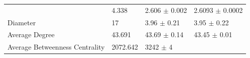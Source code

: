 \documentclass[12pt,twoside]{amherstthesis}
\begin{document}
\begin{longtable}[]{@{}llll@{}}
\begin{minipage}[t]{0.29\columnwidth}
  \end{minipage} & \begin{minipage}[t]{0.11\columnwidth}\raggedright\strut
  4.338\strut
  \end{minipage} & \begin{minipage}[t]{0.25\columnwidth}\raggedright\strut
  2.606 \(\pm\) 0.002\strut
  \end{minipage} & \begin{minipage}[t]{0.25\columnwidth}\raggedright\strut
  2.6093 \(\pm\) 0.0002\strut
  \end{minipage}\tabularnewline
  \begin{minipage}[t]{0.29\columnwidth}\raggedright\strut
  Diameter\strut
  \end{minipage} & \begin{minipage}[t]{0.11\columnwidth}\raggedright\strut
  17\strut
  \end{minipage} & \begin{minipage}[t]{0.25\columnwidth}\raggedright\strut
  3.96 \(\pm\) 0.21\strut
  \end{minipage} & \begin{minipage}[t]{0.25\columnwidth}\raggedright\strut
  3.95 \(\pm\) 0.22\strut
  \end{minipage}\tabularnewline
  \begin{minipage}[t]{0.29\columnwidth}\raggedright\strut
  Average Degree\strut
  \end{minipage} & \begin{minipage}[t]{0.11\columnwidth}\raggedright\strut
  43.691\strut
  \end{minipage} & \begin{minipage}[t]{0.25\columnwidth}\raggedright\strut
  43.69 \(\pm\) 0.14\strut
  \end{minipage} & \begin{minipage}[t]{0.25\columnwidth}\raggedright\strut
  43.45 \(\pm\) 0.01\strut
  \end{minipage}\tabularnewline
  \begin{minipage}[t]{0.29\columnwidth}\raggedright\strut
  Average Betweenness Centrality\strut
  \end{minipage} & \begin{minipage}[t]{0.11\columnwidth}\raggedright\strut
  2072.642\strut
  \end{minipage} & \begin{minipage}[t]{0.25\columnwidth}\raggedright\strut
  3242 \(\pm\) 4\strut
  \end{minipage} & \begin{minipage}[t]{0.25\columnwidth}\raggedright\strut

\end{minipage}
\end{longtable}
\end{document}
